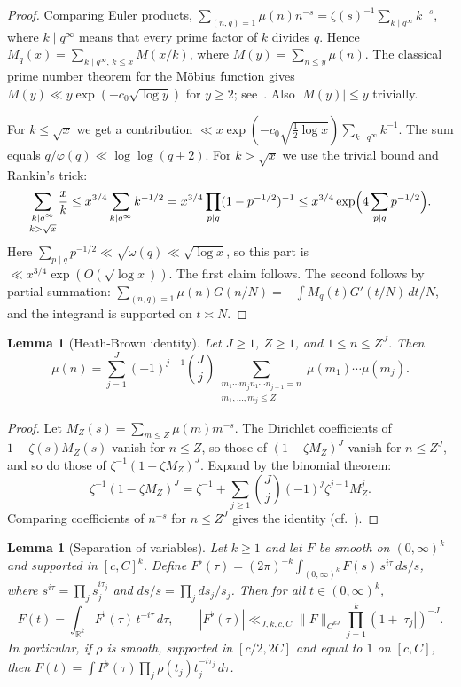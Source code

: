 \documentclass[11pt]{amsart}
\newtheorem{lemma}[theorem]{Lemma}
\theoremstyle{definition}
\theoremstyle{remark}
\numberwithin{equation}{section}
\newcommand{\R}{\mathbb R}
\begin{document}
\begin{proof}
Comparing Euler products,
$\sum_{(n,q)=1}\mu(n)n^{-s}=\zeta(s)^{-1}\sum_{k\mid q^\infty}k^{-s}$, where
$k\mid q^\infty$ means that every prime factor of $k$ divides $q$.  Hence
$M_q(x)=\sum_{k\mid q^\infty,\,k\le x}M(x/k)$, where
$M(y)=\sum_{n\le y}\mu(n)$.  The classical prime number theorem for the
M\"obius function gives $M(y)\ll y\exp(-c_0\sqrt{\log y})$ for $y\ge2$;
see~\cite[Ch.~6]{MV}.  Also $|M(y)|\le y$ trivially.

For $k\le\sqrt x$ we get a contribution
$\ll x\exp(-c_0\sqrt{\tfrac12\log x})\sum_{k\mid q^\infty}k^{-1}$.  The sum
equals $q/\varphi(q)\ll\log\log(q+2)$.  For $k>\sqrt x$ we use the trivial
bound and Rankin's trick:
\[
 \sum_{\substack{k\mid q^\infty\\k>\sqrt x}}\frac xk
 \le x^{3/4}\sum_{k\mid q^\infty}k^{-1/2}
 =x^{3/4}\prod_{p\mid q}(1-p^{-1/2})^{-1}
 \le x^{3/4}\exp\Bigl(4\sum_{p\mid q}p^{-1/2}\Bigr).
\]
Here $\sum_{p\mid q}p^{-1/2}\ll\sqrt{\omega(q)}\ll\sqrt{\log x}$, so this
part is $\ll x^{3/4}\exp(O(\sqrt{\log x}))$.  The first claim follows.  The
second follows by partial summation:
$\sum_{(n,q)=1}\mu(n)G(n/N)=-\int M_q(t)G'(t/N)\,dt/N$, and the integrand
is supported on $t\asymp N$.
\end{proof}

\begin{lemma}[Heath-Brown identity]\label{lem:HB}
Let $J\ge1$, $Z\ge1$, and $1\le n\le Z^J$.  Then
\[
 \mu(n)=\sum_{j=1}^{J}(-1)^{j-1}\binom Jj
 \sum_{\substack{m_1\cdots m_j n_1\cdots n_{j-1}=n\\ m_1,\dots,m_j\le Z}}
 \mu(m_1)\cdots\mu(m_j).
\]
\end{lemma}

\begin{proof}
Let $M_Z(s)=\sum_{m\le Z}\mu(m)m^{-s}$.  The Dirichlet coefficients of
$1-\zeta(s)M_Z(s)$ vanish for $n\le Z$, so those of $(1-\zeta M_Z)^J$
vanish for $n\le Z^J$, and so do those of $\zeta^{-1}(1-\zeta M_Z)^J$.
Expand by the binomial theorem:
\[
 \zeta^{-1}(1-\zeta M_Z)^J
 =\zeta^{-1}+\sum_{j\ge1}\binom Jj(-1)^j\zeta^{j-1}M_Z^j .
\]
Comparing coefficients of $n^{-s}$ for $n\le Z^J$ gives the identity
(cf.~\cite{HB82}).
\end{proof}

\begin{lemma}[Separation of variables]\label{lem:separation}
Let $k\ge1$ and let $F$ be smooth on $(0,\infty)^k$ and supported in
$[c,C]^k$.  Define
$F^\flat(\tau)=(2\pi)^{-k}\int_{(0,\infty)^k}F(s)\,s^{i\tau}\,ds/s$, where
$s^{i\tau}=\prod_j s_j^{i\tau_j}$ and $ds/s=\prod_j ds_j/s_j$.  Then for all
$t\in(0,\infty)^k$,
\[
 F(t)=\int_{\R^k}F^\flat(\tau)\,t^{-i\tau}\,d\tau ,
 \qquad
 |F^\flat(\tau)|\ll_{J,k,c,C}\|F\|_{C^{kJ}}\prod_{j=1}^k(1+|\tau_j|)^{-J}.
\]
In particular, if $\rho$ is smooth, supported in $[c/2,2C]$ and equal to
$1$ on $[c,C]$, then
$F(t)=\int F^\flat(\tau)\prod_j\rho(t_j)t_j^{-i\tau_j}\,d\tau$.
\end{lemma}
\end{document}
